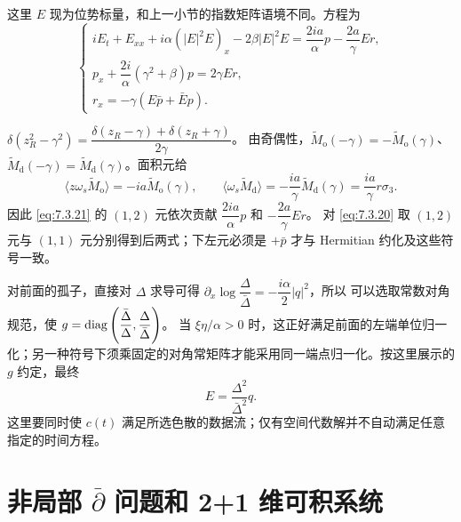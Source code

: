 \documentclass[lang=cn,scheme=chinese,mode=simple,device=normal,color=blue,math=cm,thmcnt=section,12pt]{elegantbook}
\newcommand{\eqq}[2]{\tag{#1}\label{eq:#1}#2}
\begin{document}
这里 $E$ 现为位势标量，和上一小节的指数矩阵语境不同。方程为
\begin{equation}
\eqq{7.3.24}{\begin{cases}
iE_t+E_{xx}+i\alpha(|E|^2E)_x-2\beta|E|^2E=\dfrac{2ia}{\alpha}p-\dfrac{2a}{\gamma}Er,\\
p_x+\dfrac{2i}{\alpha}(\gamma^2+\beta)p=2\gamma Er,\\
r_x=-\gamma(E\bar p+\bar Ep).
\end{cases}}
\end{equation}
\begin{callout}[计算：两个实谱点的取值与系数 $2$]
$\delta(z_R^2-\gamma^2)=\dfrac{\delta(z_R-\gamma)+\delta(z_R+\gamma)}{2\gamma}$。
由奇偶性，$\widetilde M_{\mathrm o}(-\gamma)=-\widetilde M_{\mathrm o}(\gamma)$、$\widetilde M_{\mathrm d}(-\gamma)=\widetilde M_{\mathrm d}(\gamma)$。面积元给
\[
\langle z\omega_s\widetilde M_{\mathrm o}\rangle=-ia\widetilde M_{\mathrm o}(\gamma),\qquad
\langle\omega_s\widetilde M_{\mathrm d}\rangle=-\dfrac{ia}{\gamma}\widetilde M_{\mathrm d}(\gamma)
=\dfrac{ia}{\gamma}r\sigma_3.
\]
因此 \eqref{eq:7.3.21} 的 $(1,2)$ 元依次贡献 $\dfrac{2ia}{\alpha}p$ 和 $-\dfrac{2a}{\gamma}Er$。
对 \eqref{eq:7.3.20} 取 $(1,2)$ 元与 $(1,1)$ 元分别得到后两式；下左元必须是 $+\bar p$ 才与 Hermitian 约化及这些符号一致。
\end{callout}
对前面的孤子，直接对 $\Delta$ 求导可得
$\partial_x\log\dfrac{\Delta}{\bar\Delta}=-\dfrac{i\alpha}{2}|q|^2$，所以
可以选取常数对角规范，使 $g=\operatorname{diag}\left(\dfrac{\bar\Delta}{\Delta},\dfrac{\Delta}{\bar\Delta}\right)$。
当 $\xi\eta/\alpha>0$ 时，这正好满足前面的左端单位归一化；另一种符号下须乘固定的对角常矩阵才能采用同一端点归一化。按这里展示的 $g$ 约定，最终
\[
E=\dfrac{\Delta^2}{\bar\Delta^2}q.
\]
这里要同时使 $c(t)$ 满足所选色散的数据流；仅有空间代数解并不自动满足任意指定的时间方程。

\section{非局部 \texorpdfstring{$\bar\partial$}{dbar} 问题和 2+1 维可积系统}
\end{document}
